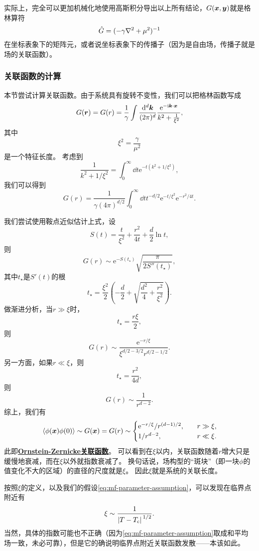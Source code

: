 \documentclass[hyperref, UTF8, a4paper]{ctexart}
\newcommand*{\ii}{\mathrm{i}}
\newcommand*{\ee}{\mathrm{e}}
\newcommand*{\concept}[1]{\underline{\textbf{#1}}}
\begin{document}
实际上，完全可以更加机械化地使用高斯积分导出以上所有结论，$G(\vb*{x}, \vb*{y})$就是格林算符
\[
    \hat{G} = (-\gamma \laplacian + \mu^2)^{-1}
\]
在坐标表象下的矩阵元，或者说坐标表象下的传播子（因为是自由场，传播子就是场的关联函数）。

\subsubsection{关联函数的计算}

本节尝试计算关联函数。由于系统具有旋转不变性，我们可以把格林函数写成
\[
    G(\vb*{r}) = G(r) = \frac{1}{\gamma} \int \frac{\dd[d]{\vb*{k}}}{(2\pi)^d} \frac{\ee^{-\ii \vb*{k} \cdot \vb*{x}}}{k^2 + \frac{1}{\xi^2}},
\]
其中
\begin{equation}
    \xi^2 = \frac{\gamma}{\mu^2}
\end{equation}
是一个特征长度。
考虑到
\[
    \frac{1}{k^2 + 1/\xi^2} = \int_0^\infty \dd{t} \ee^{-t(k^2 + 1/\xi^2)},
\]
我们可以得到
\begin{equation}
    G(r) = \frac{1}{\gamma (4\pi)^{d/2}} \int_0^\infty \dd{t} t^{-d/2} \ee^{-t/\xi^2} \ee^{-r^2/4t}.
\end{equation}

我们尝试使用鞍点近似估计上式，设
\[
    S(t) = \frac{t}{\xi^2} + \frac{r^2}{4 t} + \frac{d}{2} \ln t,
\]
则
\[
    G(r) \sim \ee^{-S(t_\star)} \sqrt{\frac{\pi}{2 S''(t_\star)}},
\]
其中$t_\star$是$S'(t)$的根
\[
    t_\star = \frac{\xi^2}{2} \left( - \frac{d}{2} + \sqrt{\frac{d^2}{4} + \frac{r^2}{\xi^2}} \right).
\]
做渐进分析，当$r \gg \xi$时，
\[
    t_\star = \frac{r \xi}{2},
\]
则
\[
    G(r) \sim \frac{\ee^{-r/\xi}}{\xi^{d/2-3/2} r^{d/2 - 1/2}}.
\]
另一方面，如果$r \ll \xi$，则
\[
    t_\star = \frac{r^2}{4d},
\]
则
\[
    G(r) \sim \frac{1}{r^{d-2}}.
\]
综上，我们有
\begin{equation}
    \expval*{\phi(\vb*{x}) \phi(0)} \sim G(\vb*{x}) = G(r) \sim \begin{cases}
        \ee^{-r/\xi} / r^{(d-1)/2}, \quad &r \gg \xi, \\
        1/r^{d-2}, \quad &r \ll \xi.
    \end{cases}
\end{equation}
此即\concept{Ornstein-Zernicke关联函数}。
可以看到在$\xi$以内，关联函数随着$r$增大只是缓慢地衰减，而在$\xi$以外就指数衰减了。
换句话说，场构型的“斑块”（即一块$\phi$的值变化不大的区域）的直径的尺度就是$\xi$。
因此$\xi$就是系统的关联长度。

按照$\xi$的定义，以及我们的假设\eqref{eq:mf-parameter-assumption}，可以发现在临界点附近有
\begin{equation}
    \xi \sim \frac{1}{\abs*{T - T_\text{c}}^{1/2}}. 
\end{equation}
当然，具体的指数可能也不正确（因为\eqref{eq:mf-parameter-assumption}取成和平均场一致，未必可靠），但是它的确说明临界点附近关联函数发散——本该如此。
\end{document}
